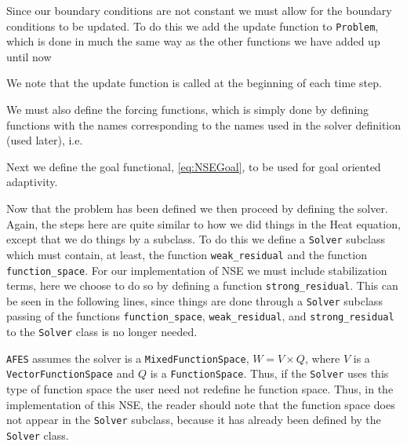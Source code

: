     Since our boundary conditions are not constant we must allow for the
    boundary conditions to be updated. To do this we add the update function to
    \texttt{Problem}, which is done in much the same way as the other functions
    we have added up until now
    

    \begin{remark}
        We note that the update function is called at the beginning
        of each time step.
    \end{remark}

    We must also define the forcing functions, which is simply done by defining
    functions with the names corresponding to the names used in the solver
    definition (used later), i.e.
    

    Next we define the goal functional, \eqref{eq:NSEGoal}, to be used for goal
    oriented adaptivity.
    

    Now that the problem has been defined we then proceed by defining the
    solver. Again, the steps here are quite similar to how we did things in the
    Heat equation, except that we do things by a subclass.  To do this we define
    a \texttt{Solver} subclass which must contain, at least, the function
    \texttt{weak\_residual} and the function \texttt{function\_space}. For our
    implementation of NSE we must include stabilization terms, here we choose to
    do so by defining a function \texttt{strong\_residual}.  This can be seen in
    the following lines, since things are done through a \texttt{Solver}
    subclass passing of the functions \texttt{function\_space},
    \texttt{weak\_residual}, and \texttt{strong\_residual} to the
    \texttt{Solver} class is no longer needed.

    \begin{remark}
        \texttt{AFES} assumes the solver is a \texttt{MixedFunctionSpace}, $W =
        V \times Q$, where $V$ is a \texttt{VectorFunctionSpace} and $Q$ is a
        \texttt{FunctionSpace}. Thus, if the \texttt{Solver} uses this type of
        function space the user need not redefine he function space. Thus, in
        the implementation of this NSE, the reader should note that the function
        space does not appear in the \texttt{Solver} subclass, because it has
        already been defined by the \texttt{Solver} class.
    \end{remark}

